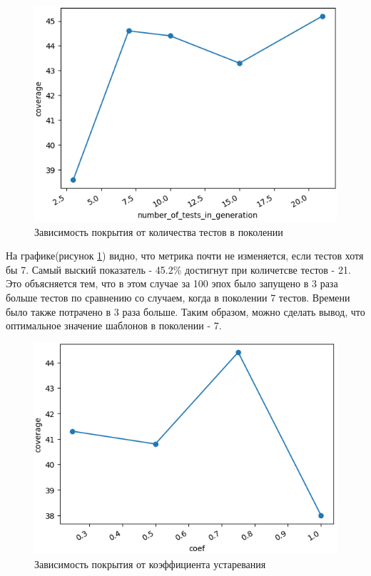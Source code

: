\documentclass[a4paper]{article}
\begin{document}
\begin{figure}[ht!]
    \includegraphics[width=170mm]{generation.png}
    \caption{Зависимость покрытия от количества тестов в поколении}
    \label{Generation}
    \end{figure}

На графике(рисунок \ref{Generation}) видно, что метрика почти не изменяется, если тестов хотя бы 7. Самый выский показатель - 45.2\% достигнут при количетсве тестов - 21. Это объясняется тем, что в этом случае за 100 эпох было запущено в 3 раза больше тестов по сравнению со случаем, когда в поколении 7 тестов. Времени было также потрачено в 3 раза больше. Таким образом, можно сделать вывод, что оптимальное значение шаблонов в поколении - 7.

\begin{figure}[ht!]
    \includegraphics[width=170mm]{coef.png}
    \caption{Зависимость покрытия от коэффициента устаревания}
    \label{Coef}
    \end{figure}
\end{document}
